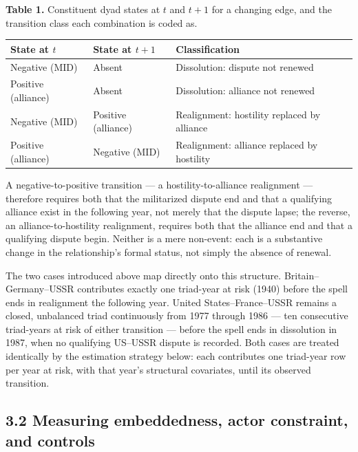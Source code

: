 \documentclass[Afour,sageh,times,doublespace]{sagej}
\begin{document}
\begin{table}[t]
\centering
\textbf{Table 1.} Constituent dyad states at $t$ and $t{+}1$ for a changing edge, and the transition class each combination is coded as.

\vspace{4pt}
{\small\sf
\begin{tabular}{lll}
\toprule
State at $t$ & State at $t{+}1$ & Classification\\
\midrule
Negative (MID) & Absent & Dissolution: dispute not renewed\\
Positive (alliance) & Absent & Dissolution: alliance not renewed\\
Negative (MID) & Positive (alliance) & Realignment: hostility replaced by alliance\\
Positive (alliance) & Negative (MID) & Realignment: alliance replaced by hostility\\
\bottomrule
\end{tabular}
\par}
\end{table}

A negative-to-positive transition --- a hostility-to-alliance realignment --- therefore requires both that the militarized dispute end and that a qualifying alliance exist in the following year, not merely that the dispute lapse; the reverse, an alliance-to-hostility realignment, requires both that the alliance end and that a qualifying dispute begin. Neither is a mere non-event: each is a substantive change in the relationship's formal status, not simply the absence of renewal.

The two cases introduced above map directly onto this structure. Britain--Germany--USSR contributes exactly one triad-year at risk (1940) before the spell ends in realignment the following year. United States--France--USSR remains a closed, unbalanced triad continuously from 1977 through 1986 --- ten consecutive triad-years at risk of either transition --- before the spell ends in dissolution in 1987, when no qualifying US--USSR dispute is recorded. Both cases are treated identically by the estimation strategy below: each contributes one triad-year row per year at risk, with that year's structural covariates, until its observed transition.

\subsection*{3.2 Measuring embeddedness, actor constraint, and controls}
\end{document}
